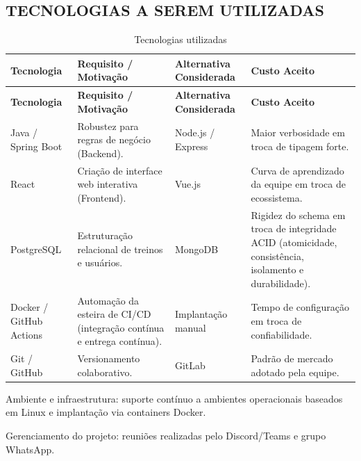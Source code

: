 \subsection{TECNOLOGIAS A SEREM UTILIZADAS}

\begingroup
\small
\setlength{\tabcolsep}{4pt}
\renewcommand{\arraystretch}{1.2}
\begin{longtable}{|>{\raggedright\arraybackslash}p{}|>{\raggedright\arraybackslash}p{}|>{\raggedright\arraybackslash}p{}|>{\raggedright\arraybackslash}p{}|}
\caption{Tecnologias utilizadas}\\
\hline
\textbf{Tecnologia} & \textbf{Requisito / Motivação} & \textbf{Alternativa Considerada} & \textbf{Custo Aceito} \\ \hline
\endfirsthead
\textbf{Tecnologia} & \textbf{Requisito / Motivação} & \textbf{Alternativa Considerada} & \textbf{Custo Aceito} \\ \hline
\endhead
Java / Spring Boot & Robustez para regras de negócio (Backend). & Node.js / Express & Maior verbosidade em troca de tipagem forte. \\ \hline
React & Criação de interface web interativa (Frontend). & Vue.js & Curva de aprendizado da equipe em troca de ecossistema. \\ \hline
PostgreSQL & Estruturação relacional de treinos e usuários. & MongoDB & Rigidez do schema em troca de integridade ACID (atomicidade, consistência, isolamento e durabilidade). \\ \hline
Docker / GitHub Actions & Automação da esteira de CI/CD (integração contínua e entrega contínua). & Implantação manual & Tempo de configuração em troca de confiabilidade. \\ \hline
Git / GitHub & Versionamento colaborativo. & GitLab & Padrão de mercado adotado pela equipe. \\ \hline
\end{longtable}
\endgroup


Ambiente e infraestrutura: suporte contínuo a ambientes operacionais baseados em Linux e implantação via containers Docker.

Gerenciamento do projeto: reuniões realizadas pelo Discord/Teams e grupo WhatsApp.
